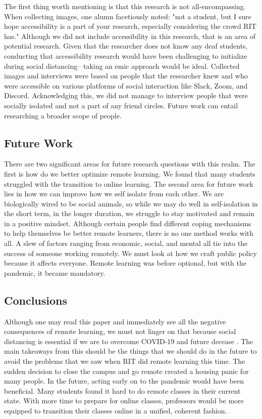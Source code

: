 \documentclass[12pt,
 reprint,
nofootinbib,
 amsmath,amssymb,
 aps,
floatfix,
]{revtex4-2}
\begin{document}
The first thing worth mentioning is that this research is not all-encompassing. When collecting images, one alumn facetiously noted: "not a student, but I sure hope accessibility is a part of your research, especially considering the crowd RIT has." Although we did not include accessibility in this research, that is an area of potential research. Given that the researcher does not know any deaf students, conducting that accessibility research would have been challenging to initialize during social distancing-- taking an emic approach would be ideal.
Collected images and interviews were based on people that the researcher knew and who were accessible on various platforms of social interaction like Slack, Zoom, and Discord. Acknowledging this, we did not manage to interview people that were socially isolated and not a part of any friend circles. Future work can entail researching a broader scope of people. 



\subsection{Future Work}


There are two significant areas for future research questions with this realm. The first is how do we better optimize remote learning. We found that many students struggled with the transition to online learning. The second area for future work lies in how we can improve how we self isolate from each other. We are biologically wired to be social animals, so while we may do well in self-isolation in the short term, in the longer duration, we struggle to stay motivated and remain in a positive mindset. Although certain people find different coping mechanisms to help themselves be better remote learners, there is no one method works with all. A slew of factors ranging from economic, social, and mental all tie into the success of someone working remotely. We must look at how we craft public policy because it affects everyone. Remote learning was before optional, but with the pandemic, it became mandatory.


\subsection{Conclusions}

Although one may read this paper and immediately see all the negative consequences of remote learning, we must not linger on that because social distancing is essential if we are to overcome COVID-19 and future decease \cite{covidItaly}. The main takeaways from this should be the things that we should do in the future to avoid the problems that we saw when RIT did remote learning this time. The sudden decision to close the campus and go remote created a housing panic for many people. In the future, acting early on to the pandemic would have been beneficial. Many students found it hard to do remote classes in their current state. With more time to prepare for online classes, professors would be more equipped to transition their classes online in a unified, coherent fashion.
\end{document}
